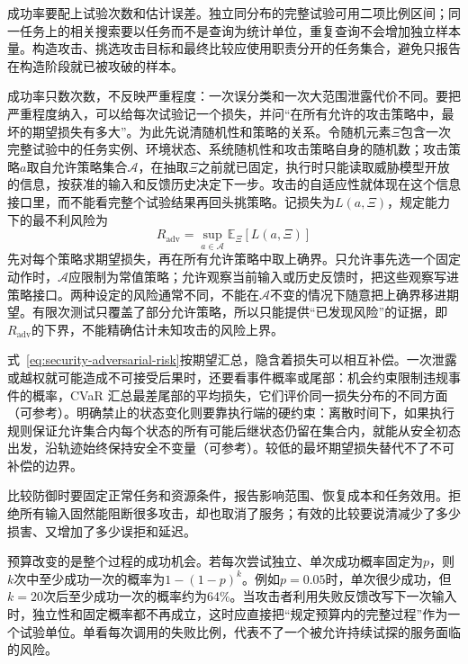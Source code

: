 成功率要配上试验次数和估计误差。独立同分布的完整试验可用二项比例区间；同一任务上的相关搜索要以任务而不是查询为统计单位，重复查询不会增加独立样本量。构造攻击、挑选攻击目标和最终比较应使用职责分开的任务集合，避免只报告在构造阶段就已被攻破的样本。

成功率只数次数，不反映严重程度：一次误分类和一次大范围泄露代价不同。要把严重程度纳入，可以给每次试验记一个损失，并问“在所有允许的攻击策略中，最坏的期望损失有多大”。为此先说清随机性和策略的关系。令随机元素$\Xi$包含一次完整试验中的任务实例、环境状态、系统随机性和攻击策略自身的随机数；攻击策略$a$取自允许策略集合$\mathcal A$，在抽取$\Xi$之前就已固定，执行时只能读取威胁模型开放的信息，按获准的输入和反馈历史决定下一步。攻击的自适应性就体现在这个信息接口里，而不能看完整个试验结果再回头挑策略。记损失为$L(a,\Xi)$，规定能力下的最不利风险为
\begin{equation}
 R_{\mathrm{adv}}=\sup_{a\in\mathcal A}
 \mathbb E_{\Xi}[L(a,\Xi)]
 \label{eq:security-adversarial-risk}
\end{equation}
先对每个策略求期望损失，再在所有允许策略中取上确界。只允许事先选一个固定动作时，$\mathcal A$应限制为常值策略；允许观察当前输入或历史反馈时，把这些观察写进策略接口。两种设定的风险通常不同，不能在$\mathcal A$不变的情况下随意把上确界移进期望。有限次测试只覆盖了部分允许策略，所以只能提供“已发现风险”的证据，即$R_{\mathrm{adv}}$的下界，不能精确估计未知攻击的风险上界。

式~\eqref{eq:security-adversarial-risk}按期望汇总，隐含着损失可以相互补偿。一次泄露或越权就可能造成不可接受后果时，还要看事件概率或尾部：机会约束限制违规事件的概率，CVaR 汇总最差尾部的平均损失，它们评价同一损失分布的不同方面（可参考）。明确禁止的状态变化则要靠执行端的硬约束：离散时间下，如果执行规则保证允许集合内每个状态的所有可能后继状态仍留在集合内，就能从安全初态出发，沿轨迹始终保持安全不变量（可参考）。较低的最坏期望损失替代不了不可补偿的边界。

比较防御时要固定正常任务和资源条件，报告影响范围、恢复成本和任务效用。拒绝所有输入固然能阻断很多攻击，却也取消了服务；有效的比较要说清减少了多少损害、又增加了多少误拒和延迟。

预算改变的是整个过程的成功机会。若每次尝试独立、单次成功概率固定为$p$，则$k$次中至少成功一次的概率为$1-(1-p)^k$。例如$p=0.05$时，单次很少成功，但$k=20$次后至少成功一次的概率约为64\%。当攻击者利用失败反馈改写下一次输入时，独立性和固定概率都不再成立，这时应直接把“规定预算内的完整过程”作为一个试验单位。单看每次调用的失败比例，代表不了一个被允许持续试探的服务面临的风险。

